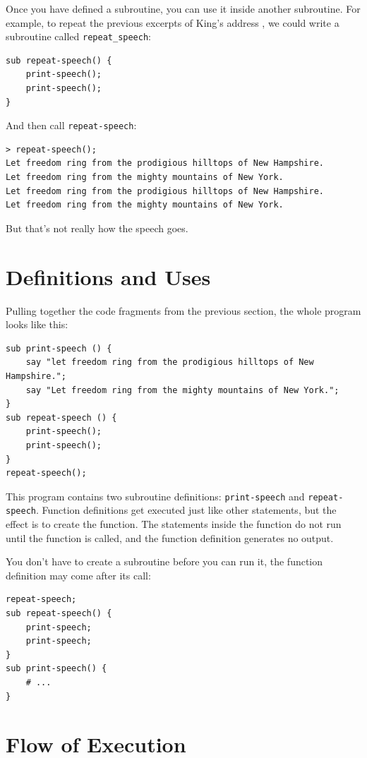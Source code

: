 Once you have defined a subroutine, you can use it inside another
subroutine.  For example, to repeat the previous excerpts of
King's address ,  we could write a subroutine called \verb"repeat_speech":

\begin{verbatim}
sub repeat-speech() {
    print-speech();
    print-speech();
}
\end{verbatim}
%
And then call \verb"repeat-speech":

\begin{verbatim}
> repeat-speech();
Let freedom ring from the prodigious hilltops of New Hampshire.
Let freedom ring from the mighty mountains of New York.
Let freedom ring from the prodigious hilltops of New Hampshire.
Let freedom ring from the mighty mountains of New York.
\end{verbatim}
%
But that's not really how the speech goes.


\section{Definitions and Uses}

Pulling together the code fragments from the previous section, the
whole program looks like this:

\begin{verbatim}
sub print-speech () {
    say "let freedom ring from the prodigious hilltops of New Hampshire.";
    say "Let freedom ring from the mighty mountains of New York.";
}
sub repeat-speech () {
    print-speech();
    print-speech();
}
repeat-speech();
\end{verbatim}
%
This program contains two subroutine definitions: \verb"print-speech" and
\verb"repeat-speech".  Function definitions get executed just like other
statements, but the effect is to create the function.  The statements
inside the function do not run until the function is called, and
the function definition generates no output.

You don't have to create a subroutine before you can run it, 
the function definition may come after its call:
\begin{verbatim}
repeat-speech;
sub repeat-speech() {
    print-speech;
    print-speech;
}
sub print-speech() {
    # ...
}
\end{verbatim}


\section{Flow of Execution}

